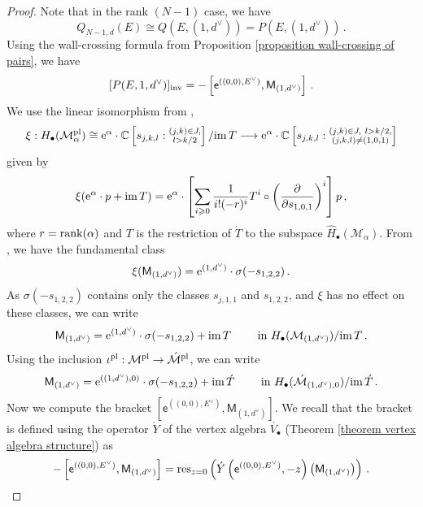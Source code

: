 \documentclass[11pt]{amsart}
\theoremstyle{remark}
\newcommand{\p}{\partial}
\newcommand{\mb}[1]{\mathbb{#1}}
\newcommand{\M}{\mathcal{M}}
\newcommand{\Mdash}{\acute{\mathcal{M}}}
\newcommand{\im}{\textnormal{im}\,}
\newcommand{\rk}{\textnormal{rank}}
\newcommand{\wh}[1]{\widehat{#1}}
\newcommand{\inv}[0]{\textnormal{inv}}
\newcommand{\pl}[0]{\textnormal{pl}}
\newcommand{\sfM}{\mathsf M}
\newcommand{\Sdash}[0]{\acute{S}}
\newcommand{\res}{\textnormal{res}}
\newcommand{\ex}{\textnormal{e}}
\newcommand{\du}{d^\vee}
\numberwithin{theorem}{section}
\begin{document}
\begin{proof}
Note that in the rank $(N-1)$ case, we have
$$ Q_{N-1,d}(E) \cong Q(E,(1,\du)) = P(E,(1,\du))\,.$$
Using the wall-crossing formula from Proposition \eqref{proposition wall-crossing of pairs},
we have 
$$ [P(E,1,\du)]_\inv = - \left[ \mathsf e^{((0,0),E^\vee)}, \sfM_{(1,\du)} \right] \,.$$
We use the linear isomorphism from \cite[Equation 2.106]{Bu23},
$$ \xi : H_\bullet(\M_\alpha^\pl) \cong \ex^{\alpha} \cdot \mb C\left[s_{j,k,l} : \substack{(j,k)\in J,\\ l>k/2} \right]/\im T  \longrightarrow \ex^{\alpha} \cdot 
\mb C\left[s_{j,k,l} : \substack{(j,k)\in J,\ l>k/2, \\ (j,k,l) \neq (1,0,1)} \right] $$
given by 
$${\xi}(\ex^{\alpha} \cdot p + \im T) = \ex^{\alpha} \cdot \left[ \sum_{i\geqslant 0} \frac{1}{i!(-r)^i} {T}^i \circ \left( \frac{\p}{\p s_{1,0,1}} \right)^i \right] p\,,$$
where $r = \rk(\alpha)$ and $T$ is the restriction of 
$\acute T$ to the subspace $\wh H_\bullet (\M_{\alpha})$.
From \cite[Theorem 4.2]{Bu23}, we have the fundamental class
$$ \xi( \sfM_{(1,\du)} ) = \ex^{(1,\du)} \cdot \sigma(-s_{1,2,2})\,.$$
As $\sigma(-s_{1,2,2})$ contains only the classes $s_{j,1,1}$ and $s_{1,2,2}$, and $\xi$ has no effect on these classes, we can write
$$\sfM_{(1,\du)}  =  \ex^{(1,\du)} \cdot \sigma(-s_{1,2,2}) + \im T 
\qquad \text{ in } H_\bullet(\M_{(1,\du)})/\im T
\,.$$
Using the inclusion $\iota^\pl : \M^\pl \to \Mdash^\pl$,
we can write
$$\sfM_{(1,\du)}  =  \ex^{((1,\du),0)} \cdot \sigma(-s_{1,2,2}) + \im \acute{T}
\qquad \text{ in } H_\bullet(\Mdash_{(1,\du),0})/\im \acute{T}
\,.$$
Now we compute the bracket $\left[ \mathsf e^{((0,0),E^\vee)}, \sfM_{(1,\du)} \right] $.
We recall that the bracket is defined using the operator $\acute{Y}$ of the vertex algebra $\acute{V_\bullet}$ (Theorem \ref{theorem vertex algebra structure}) as
$$-\left[ \mathsf e^{((0,0),E^\vee)}, \sfM_{(1,\du)} \right] 
= \res_{z=0} \left(\acute{Y} \left(\mathsf e^{((0,0),E^\vee)}, -z\right) \left(\sfM_{(1,\du)}\right) \right) \,. $$

\end{proof}
\end{document}
